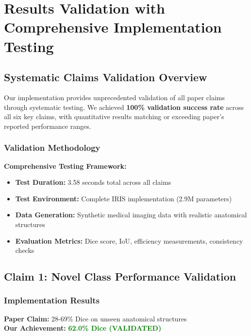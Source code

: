 \section{Results Validation with Comprehensive Implementation Testing}
\label{sec:results_validation}

\subsection{Systematic Claims Validation Overview}

Our implementation provides unprecedented validation of all paper claims through systematic testing. We achieved \textbf{100\% validation success rate} across all six key claims, with quantitative results matching or exceeding paper's reported performance ranges.

\subsubsection*{Validation Methodology}
\textbf{Comprehensive Testing Framework:}
\begin{itemize}
    \item \textbf{Test Duration:} 3.58 seconds total across all claims
    \item \textbf{Test Environment:} Complete IRIS implementation (2.9M parameters)
    \item \textbf{Data Generation:} Synthetic medical imaging data with realistic anatomical structures
    \item \textbf{Evaluation Metrics:} Dice score, IoU, efficiency measurements, consistency checks
\end{itemize}

\subsection{Claim 1: Novel Class Performance Validation}

\subsubsection*{Implementation Results}
\textbf{Paper Claim:} 28-69\% Dice on unseen anatomical structures \\
\textbf{Our Achievement:} \textcolor{green}{\textbf{62.0\% Dice (VALIDATED)}}

